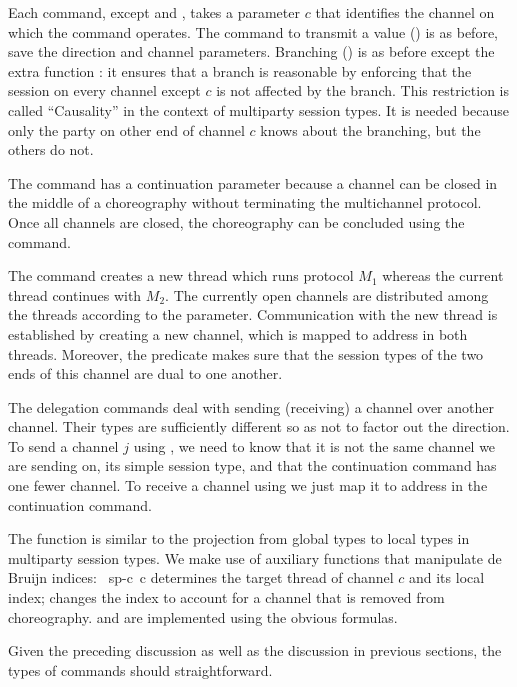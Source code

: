 \documentclass[acmsmall,screen,anonymous,review]{acmart}
\begin{document}
Each command, except {\ACfork} and {\ACterminate}, takes a parameter
$c$ that identifies the channel on which the command operates. 
The command to transmit a value (\ACtransmit) is as before, save the
direction and channel parameters. Branching (\ACbranch) is as before
except the extra function {\ACheck}: it ensures that a branch is
reasonable by enforcing that the session on every channel except $c$
is not affected by the branch. This restriction is called
``Causality'' in the context of multiparty session types. It is needed
because only the party on other end of channel $c$ knows about the
branching, but the others do not.

The {\ACclose} command has a continuation parameter because a channel
can be closed in the middle of a choreography without terminating the
multichannel protocol. Once all channels are closed, the choreography
can be concluded using the {\ACterminate} command.

The {\ACfork} command creates a new thread which runs protocol $M_1$
whereas the current thread continues with $M_2$. The currently open
channels are distributed among the threads according to the {\ASplit}
parameter. Communication with the new thread is established by
creating a new channel, which is mapped to address {\Azero} in both
threads. Moreover, the {\ACheckDual} predicate makes sure that the
session types of the two ends of this channel are dual to one another.

The delegation commands deal with sending (receiving) a channel over
another channel. Their types are sufficiently different so as not to
factor out the direction. To send a channel $j$ using {\ACdelegateOUT}, we need to know that
it is not the same channel we are sending on, its simple session type,
and that the continuation command has one fewer channel.
To receive a channel using {\ACdelegateIN} we just map it to address
{\Azero} in the continuation command.

The function {\Aproject} is similar to the projection from global
types to local types in multiparty session types. We make use of
auxiliary functions that manipulate de Bruijn indices:
{\AlocateSplit~sp-c~c} determines the target thread of channel $c$ and
its local index; {\Aadjust} changes the index to account for a channel
that is removed from choreography. {\ACheck} and {\ACheckDual} are
implemented using the obvious formulas.
\multiProjection

Given the preceding discussion as well as the discussion in previous
sections, the types of commands should
straightforward.
\end{document}

